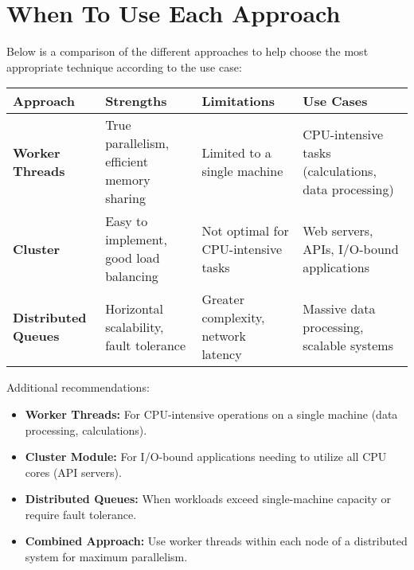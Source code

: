 \documentclass[12pt,letterpaper]{article}
\begin{document}
\section{When To Use Each Approach}

Below is a comparison of the different approaches to help choose the most appropriate technique according to the use case:

\begin{center}
\small  %
\begin{tabular}{|p{3cm}|p{3.5cm}|p{3.5cm}|p{3.5cm}|}
\hline
\textcolor{accentColor}{\textbf{Approach}} & \textcolor{primaryColor}{\textbf{Strengths}} & \textcolor{primaryColor}{\textbf{Limitations}} & \textcolor{primaryColor}{\textbf{Use Cases}} \\
\hline
\textbf{\textcolor{accentColor}{Worker Threads}} & 
True parallelism, efficient memory sharing & 
Limited to a single machine & 
CPU-intensive tasks (calculations, data processing) \\
\hline
\textbf{\textcolor{accentColor}{Cluster}} & 
Easy to implement, good load balancing & 
Not optimal for CPU-intensive tasks & 
Web servers, APIs, I/O-bound applications \\
\hline
\textbf{\textcolor{accentColor}{Distributed Queues}} & 
Horizontal scalability, fault tolerance & 
Greater complexity, network latency & 
Massive data processing, scalable systems \\
\hline
\end{tabular}
\end{center}


Additional recommendations:
\begin{itemize}
    \item \textbf{\textcolor{accentColor}{Worker Threads:}} For CPU-intensive operations on a single machine (data processing, calculations).
    
    \item \textbf{\textcolor{accentColor}{Cluster Module:}} For I/O-bound applications needing to utilize all CPU cores (API servers).
    
    \item \textbf{\textcolor{accentColor}{Distributed Queues:}} When workloads exceed single-machine capacity or require fault tolerance.
    
    \item \textbf{\textcolor{accentColor}{Combined Approach:}} Use worker threads within each node of a distributed system for maximum parallelism.
\end{itemize}
\end{document}
